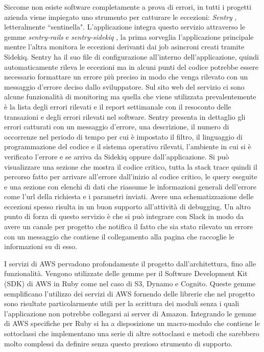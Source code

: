 \documentclass[target=bach,aauheader=,style=]{thud}
\begin{document}
Siccome non esiste software completamente a prova di errori, in tutti i progetti azienda viene impiegato uno strumento per catturare le eccezioni: \textit{Sentry} \cite{sentry}, letteralmente ``sentinella".
L'applicazione integra questo servizio attraverso le gemme \textit{sentry-rails} \cite{sentry_rails_gem} e \textit{sentry-sidekiq} \cite{sentry_sidekiq_gem}, la prima
sorveglia l'applicazione principale mentre l'altra monitora le eccezioni derivanti dai job asincroni creati tramite Sidekiq.
Sentry ha il suo file di configurazione all'interno dell'applicazione, quindi automaticamente rileva le eccezioni ma in alcuni punti del codice potrebbe essere necessario
formattare un errore più preciso in modo che venga rilevato con un messaggio d'errore deciso dallo sviluppatore.
Sul sito web del servizio ci sono alcune funzionalità di monitoring ma quella che viene utilizzata prevalentemente è la lista degli errori rilevati e il report
settimanale con il resoconto delle transazioni e degli errori rilevati nel software. Sentry presenta in dettaglio gli errori catturati con un messaggio d'errore, una descrizione,
il numero di occorrenze nel periodo di tempo per cui è impostato il filtro, il linguaggio di programmazione del codice e il sistema operativo rilevati, l'ambiente in cui si è
verificato l'errore e se arriva da Sidekiq oppure dall'applicazione. Si può visualizzare una sezione che mostra il codice critico, tutta la stack trace quindi il percorso fatto per arrivare all'errore
dall'inizio al codice critico, le query eseguite e una sezione con elenchi di dati che riassume le informazioni generali dell'errore come l'url della richiesta
e i parametri inviati. Avere una schematizzazione delle eccezioni spesso risulta in un buon supporto all'attività di debugging.
Un altro punto di forza di questo servizio è che si può integrare con Slack in modo da avere un canale per progetto che notifica il fatto che sia stato rilevato un errore con un messaggio che
contiene il collegamento alla pagina che raccoglie le informazioni su di esso.

I servizi di AWS pervadono profondamente il progetto dall'architettura, fino alle funzionalità. Vengono utilizzate delle gemme per il Software Development Kit (SDK)
di AWS \cite{aws_sdk_ruby} in Ruby come nel caso di S3, Dynamo e Cognito. Queste gemme semplificano l'utilizzo dei servizi di AWS fornendo delle librerie che
nel progetto sono risultate particolarmente utili per la scrittura dei moduli senza i quali l'applicazione non potrebbe collegarsi ai server di Amazon.
Integrando le gemme di AWS specifiche per Ruby si ha a disposizione un macro-modulo che contiene le sottoclassi che implementano una serie di altre sottoclassi e
metodi che sarebbero molto complessi da definire senza questo prezioso strumento di supporto.
\end{document}
